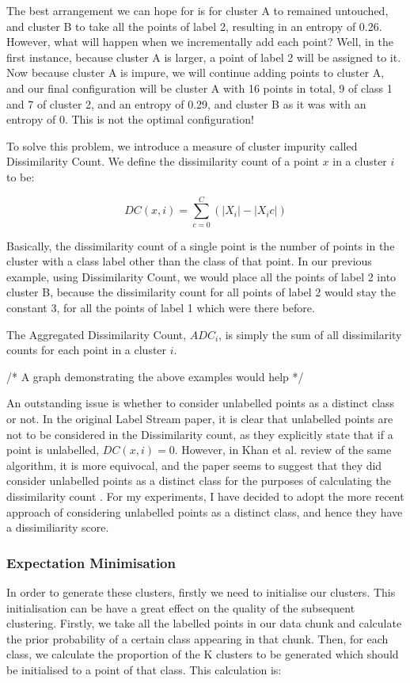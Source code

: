 \documentclass[12pt,a4paper,oneside]{report}
\begin{document}
The best arrangement we can hope for is for cluster A to remained untouched, and cluster B to take all the points of label 2, resulting in an entropy of 0.26. However, what will happen when we incrementally add each point? Well, in the first instance, because cluster A is larger, a point of label 2 will be assigned to it. Now because cluster A is impure, we will continue adding points to cluster A, and our final configuration will be cluster A with 16 points in total, 9 of class 1 and  7 of cluster 2, and an entropy of 0.29, and cluster B as it was with an entropy of 0. This is not the optimal configuration!

To solve this problem, we introduce a measure of cluster impurity called Dissimilarity Count. We define the dissimilarity count of a point \(x\) in a cluster \(i\) to be:

\[DC(x,i) = \sum_{c=0}^C(|X_i| - |X_ic|)\] 

Basically, the dissimilarity count of a single point is the number of points in the cluster with a class label other than the class of that point. In our previous example, using Dissimilarity Count, we would place all the points of label 2 into cluster B, because the dissimilarity count for all points of label 2 would stay the constant 3, for all the points of label 1 which were there before. 

The Aggregated Dissimilarity Count, $ADC_i$, is simply the sum of all dissimilarity counts for each point in a cluster $i$. 

/* A graph demonstrating the above examples would help */

An outstanding issue is whether to consider unlabelled points as a distinct class or not. In the original Label Stream paper, it is clear that unlabelled points are not to be considered in the Dissimilarity count, as they explicitly state that if a point is unlabelled, \(DC(x,i) = 0\).\cite{LabStr} However, in Khan et al. review of the same algorithm, it is more equivocal, and the paper seems to suggest that they did consider unlabelled points as a distinct class for the purposes of calculating the dissimilarity count \cite{TechRep}. For my experiments, I have decided to adopt the more recent approach of considering unlabelled points as a distinct class, and hence they have a dissimiliarity score. 
 
 \subsubsection{Expectation Minimisation} 
 In order to generate these clusters, firstly we need to initialise our clusters. This initialisation can be have a great effect on the quality of the subsequent clustering. Firstly, we take all the labelled points in our data chunk and calculate the prior probability of a certain class appearing in that chunk. Then, for each class, we calculate the proportion of the K clusters to be generated which should be initialised to a point of that class. This calculation is:
 
\end{document}
